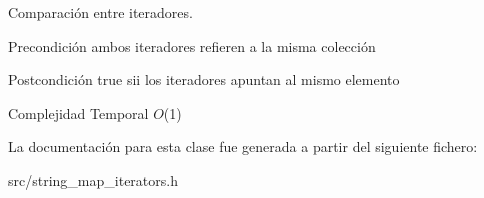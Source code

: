 Comparación entre iteradores. 

\begin{DoxyPrecond}{Precondición}
ambos iteradores refieren a la misma colección 
\end{DoxyPrecond}
\begin{DoxyPostcond}{Postcondición}
true sii los iteradores apuntan al mismo elemento
\end{DoxyPostcond}

\begin{DoxyDescription}
\item[Complejidad Temporal]$O$(1)
\end{DoxyDescription}

La documentación para esta clase fue generada a partir del siguiente fichero\-:\begin{DoxyCompactItemize}
\item 
src/string\-\_\-map\-\_\-iterators.\-h\end{DoxyCompactItemize}
